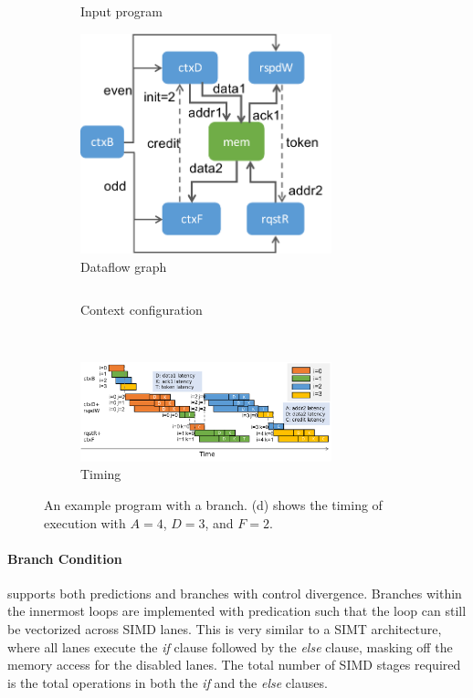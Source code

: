 \begin{figure}
\centering
  \vspace{-1cm}
\begin{subfigure}[b]{0.45\textwidth}
\inputminted{python}{code/branch.py}
\caption{Input program}
  \vspace{0.2cm}
\includegraphics[width=0.8\textwidth]{figs/branchctx.pdf}
\caption{Dataflow graph}
\end{subfigure}
\hfill
\begin{subfigure}[b]{0.48\textwidth}
\inputminted{python}{code/branchctx.py}
\caption{Context configuration}
\end{subfigure}
\\
  \vspace{0.2cm}
\begin{subfigure}[b]{\textwidth}
  \centering
\includegraphics[width=0.8\textwidth]{figs/branchtiming.pdf}
\caption{Timing}
\end{subfigure}
\caption[Branching example]{
  An example program with a branch. 
  (d) shows the timing of execution with $A=4$, $D=3$, and $F=2$.
}
\label{fig:branch} 
\end{figure}

\paragraph{Branch Condition}
\name supports both predictions and branches with control divergence.
Branches within the innermost loops are implemented with predication such that the loop can still be
vectorized across SIMD lanes.
This is very similar to a SIMT architecture, where all lanes execute the \emph{if} clause followed by the \emph{else} clause, masking off the memory access for the disabled lanes.
The total number of SIMD stages required is the total operations in both the \emph{if} and the \emph{else} clauses.

